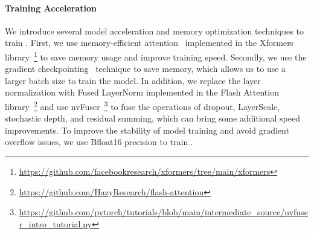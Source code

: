 \paragraph{Training Acceleration}
We introduce several model acceleration and memory optimization techniques to train \onepeace. 
First, we use memory-efficient attention~\cite{memory_efficient_attn,flash_attn} implemented in the Xformers library~\footnote{\url{https://github.com/facebookresearch/xformers/tree/main/xformers}} to save memory usage and improve training speed.
Secondly, we use the gradient checkpointing~\cite{checkpointing} technique to save memory, which allows us to use a larger batch size to train the model. 
In addition, we replace the layer normalization with Fused LayerNorm implemented in the Flash Attention library~\footnote{\url{https://github.com/HazyResearch/flash-attention}} and use nvFuser~\footnote{\url{https://github.com/pytorch/tutorials/blob/main/intermediate_source/nvfuser_intro_tutorial.py}} to fuse the operations of dropout, LayerScale, stochastic depth, and residual summing, which can bring some additional speed improvements. 
To improve the stability of model training and avoid gradient overflow issues, we use Bfloat16 precision to train \onepeace.